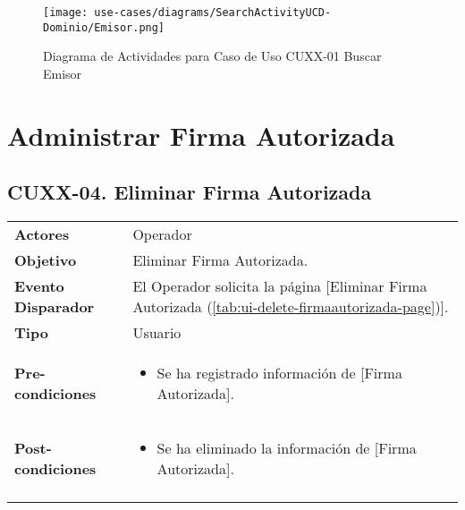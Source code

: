 	\begin{figure}[H]
		\begin{center}
			\label{tab:activity-search-ucd-entity-emisor}
			\texttt{[image: use-cases/diagrams/SearchActivityUCD-Dominio/Emisor.png]}
			\caption{Diagrama de Actividades para Caso de Uso CUXX-01 Buscar Emisor}
	\end{center}
	\end{figure}
	\clearpage
	\section{Administrar Firma Autorizada} \label{sec:cf-uc-admin-firmaautorizada}
	
	
	\clearpage
	\subsection{CUXX-04. Eliminar Firma Autorizada} \label{sec:cu-delete-FirmaAutorizada}
	
	\begin{tabular}{ p{3.5cm} p{11.5cm} }
		\textbf{Actores} & Operador\\
		\textbf{Objetivo} & Eliminar Firma Autorizada.\\
		\textbf{Evento Disparador} & El Operador solicita la p\'agina [Eliminar Firma Autorizada (\ref{tab:ui-delete-firmaautorizada-page})].\\
		\textbf{Tipo} & Usuario\\
		\textbf{Pre-condiciones} &
			\begin{minipage}[t]{0.6\textwidth}
			\begin{itemize}[noitemsep,nolistsep]
			\setlength{\itemindent}{-.5cm}
				\item Se ha registrado informaci\'on de [Firma Autorizada].
			\end{itemize}
			\end{minipage} \\
		\textbf{Post-condiciones} &
			\begin{minipage}[t]{0.6\textwidth}
			\begin{itemize}[noitemsep,nolistsep]
			\setlength{\itemindent}{-.5cm}
				\item Se ha eliminado la informaci\'on de [Firma Autorizada].
			\end{itemize}
			\end{minipage} \\
		\\
	\end{tabular}
	
